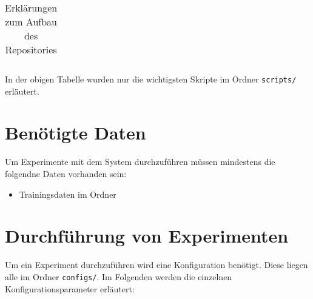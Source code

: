 \begin{appendices}
\begin{table}[H]
\begin{adjustbox}{max width=\textwidth}
\begin{tabularx}{\textwidth}{|l|l|X|}
      \bottomrule
    \end{tabularx}
  \end{adjustbox}
  \caption{Erklärungen zum Aufbau des Repositories}
\end{table}

In der obigen Tabelle wurden nur die wichtigsten Skripte im Ordner \texttt{scripts/} erläutert.

\section{Benötigte Daten}
Um Experimente mit dem System durchzuführen müssen mindestens die folgendne Daten vorhanden sein:

\begin{itemize}[noitemsep]
  \item Trainingsdaten im Ordner 
\end{itemize}

\section{Durchführung von Experimenten}
Um ein Experiment durchzuführen wird eine Konfiguration benötigt. Diese liegen alle im Ordner \texttt{configs/}. Im Folgenden werden die einzelnen Konfigurationsparameter erläutert:


\end{appendices}
